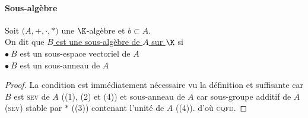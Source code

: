 		\paragraph{Sous-algèbre}
			Soit $\big( A,+,\cdot , \ast)$ une $\K$-algèbre et $b\subset A$.\\ On dit que \uline{$B$ est une sous-algèbre de $A$ sur $\K$} si \\
			\hspace*{2cm} $\bullet ~B$ est un sous-espace vectoriel de $A$\\
			\hspace*{2cm} $\bullet ~B$ est un sous-anneau de $A$ \trait
		\vspace*{0.5cm} \\ 
		\begin{proof}
		La condition est immédiatement nécessaire vu la définition et suffisante car $B$ est \textsc{sev} de $A$ ({\scriptsize (1)}, {\scriptsize (2)} et {\scriptsize (4)}) et sous-anneau de $A$ car sous-groupe additif de $A$ (\textsc{sev}) stable par $\ast$ ({\scriptsize (3)}) contenant l'unité de $A$ ({\scriptsize (4)}). d'où \textsc{cqfd}.
		\end{proof} ${}$ \traitd
